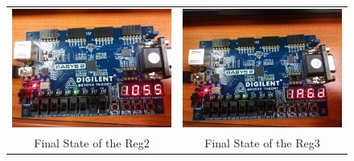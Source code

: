 \documentclass[a4paper]{article}
\begin{document}
\begin{figure}[ht!]
\begin{tabular}{c|c}
        \includegraphics[scale=0.3]{reg2}&\includegraphics[scale=0.3]{reg3}\\
        Final State of the Reg2\label{fig:reg2}&Final State of the Reg3\label{fig:reg3}
        \\

\end{tabular}
\end{figure}
\end{document}

